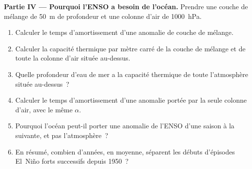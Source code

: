 \begin{problem}
\medskip\noindent\textbf{Partie IV --- Pourquoi l'ENSO a besoin de l'océan.}
Prendre une couche de mélange de \qty{50}{m} de profondeur et une colonne d'air de \qty{1000}{hPa}.
\begin{enumerate}[resume]
\item Calculer le temps d'amortissement d'une anomalie de couche de mélange.
\item Calculer la capacité thermique par mètre carré de la couche de mélange et de toute la
      colonne d'air située au-dessus.
\item Quelle profondeur d'eau de mer a la capacité thermique de toute l'atmosphère située au-dessus~?
\item Calculer le temps d'amortissement d'une anomalie portée par la seule colonne d'air, avec le même
      $\alpha$.
\item Pourquoi l'océan peut-il porter une anomalie de l'ENSO d'une saison à la suivante, et pas
      l'atmosphère~?
\item En résumé, combien d'années, en moyenne, séparent les débuts d'épisodes El~Niño forts successifs
      depuis 1950~?
\end{enumerate}
\end{problem}
